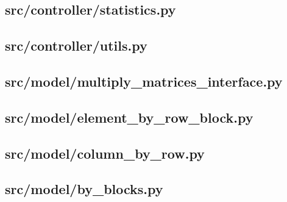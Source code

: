 \subsection{src/controller/statistics.py}
	
	\newpage

\subsection{src/controller/utils.py}
	
	\newpage

\subsection{src/model/multiply\_matrices\_interface.py}
	
	\newpage

\subsection{src/model/element\_by\_row\_block.py}
	
	\newpage

\subsection{src/model/column\_by\_row.py}
	
	\newpage

\subsection{src/model/by\_blocks.py}
	
	\newpage

